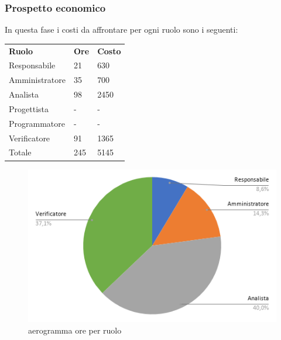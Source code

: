     \subsubsection{Prospetto economico}
    In questa fase i costi da affrontare per ogni ruolo sono i seguenti:
    \begin{center}
        \begin{table}[ht!]
            \centering
            \renewcommand{\arraystretch}{1.8}
            \begin{tabular}{p{75px} p{20px} p{30px} }
                \rowcolor{logo!70} \textbf{Ruolo} & \textbf{Ore} & \textbf{Costo}\\
                Responsabile & 21 & 630 \\
                Amministratore & 35 & 700 \\
                Analista & 98 & 2450 \\
                Progettista & - & - \\
                Programmatore & - & - \\
                Verificatore & 91 & 1365  \\
                Totale & 245 & 5145  \\
            \end{tabular}
        \end{table}
    \end{center}
    \pagebreak
    \begin{figure}[!h]
        \caption{aerogramma ore per ruolo}
        \vspace{5px}
        \includegraphics[scale=0.5]{../../../Images/Diagrammi/Diagramma a torta/ore analisi.png}
        \centering
    \end{figure}

